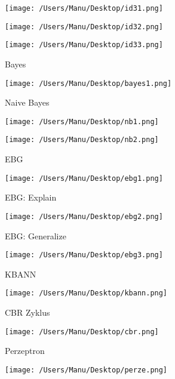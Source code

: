 \documentclass[paper=a4, fontsize=11pt]{scrartcl} %
\numberwithin{equation}{section} %
\numberwithin{figure}{section} %
\numberwithin{table}{section} %
\begin{document}
\texttt{[image: /Users/Manu/Desktop/id31.png]}

\texttt{[image: /Users/Manu/Desktop/id32.png]}

\texttt{[image: /Users/Manu/Desktop/id33.png]}

Bayes

\texttt{[image: /Users/Manu/Desktop/bayes1.png]}

Naive Bayes

\texttt{[image: /Users/Manu/Desktop/nb1.png]}

\texttt{[image: /Users/Manu/Desktop/nb2.png]}

EBG

\texttt{[image: /Users/Manu/Desktop/ebg1.png]}

EBG: Explain

\texttt{[image: /Users/Manu/Desktop/ebg2.png]}

EBG: Generalize

\texttt{[image: /Users/Manu/Desktop/ebg3.png]}

KBANN

\texttt{[image: /Users/Manu/Desktop/kbann.png]}

CBR Zyklus

\texttt{[image: /Users/Manu/Desktop/cbr.png]}

Perzeptron

\texttt{[image: /Users/Manu/Desktop/perze.png]}
\end{document}
